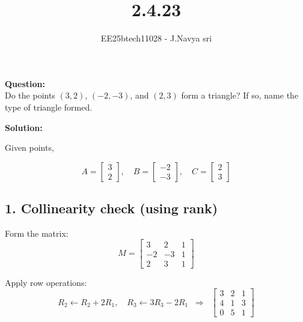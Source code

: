 \documentclass[journal]{IEEEtran}
\begin{document}

\vspace{3cm}

\title{2.4.23}
\author{EE25btech11028 - J.Navya sri}
{\let\newpage\relax\maketitle}




\textbf{Question:}\\
Do the points \( (3, 2) \), \( (-2, -3) \), and \( (2, 3) \) form a triangle? If so, name the type of triangle formed.


\vspace{0.5cm}
\textbf{Solution:}

Given points,

\begin{equation}
A=\begin{bmatrix}3\\2\end{bmatrix}, \quad 
B=\begin{bmatrix}-2\\-3\end{bmatrix}, \quad 
C=\begin{bmatrix}2\\3\end{bmatrix}
\end{equation}

\subsection*{1. Collinearity check (using rank)}

Form the matrix:
\begin{equation}
M=\begin{bmatrix}
3 & 2 & 1\\
-2 & -3 & 1\\
2 & 3 & 1
\end{bmatrix}
\end{equation}

Apply row operations:
\begin{equation}
R_2 \leftarrow R_2+2R_1,\quad R_3 \leftarrow 3R_3-2R_1
\;\;\Rightarrow\;\;
\begin{bmatrix}
3 & 2 & 1\\
4 & 1 & 3\\
0 & 5 & 1
\end{bmatrix}
\end{equation}
\end{document}
